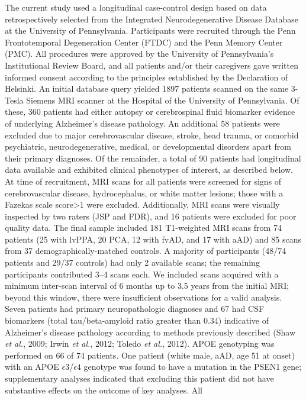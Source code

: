 \documentclass[]{article}
\begin{document}
The current study used a longitudinal case-control design based on data
retrospectively selected from the Integrated Neurodegenerative Disease
Database at the University of Pennsylvania. Participants were recruited
through the Penn Frontotemporal Degeneration Center (FTDC) and the Penn
Memory Center (PMC). All procedures were approved by the University of
Pennsylvania's Institutional Review Board, and all patients and/or their
caregivers gave written informed consent according to the principles
established by the Declaration of Helsinki. An initial database query
yielded 1897 patients scanned on the same 3-Tesla Siemens MRI scanner at
the Hospital of the University of Pennsylvania. Of these, 360 patients
had either autopsy or cerebrospinal fluid biomarker evidence of
underlying Alzheimer's disease pathology. An additional 58 patients were
excluded due to major cerebrovascular disease, stroke, head trauma, or
comorbid psychiatric, neurodegenerative, medical, or developmental
disorders apart from their primary diagnoses. Of the remainder, a total
of 90 patients had longitudinal data available and exhibited clinical
phenotypes of interest, as described below. At time of recruitment, MRI
scans for all patients were screened for signs of cerebrovascular
disease, hydrocephalus, or white matter lesions; those with a Fazekas
scale score\textgreater{}1 were excluded. Additionally, MRI scans were
visually inspected by two raters (JSP and FDR), and 16 patients were
excluded for poor quality data. The final sample included 181
T1-weighted MRI scans from 74 patients (25 with lvPPA, 20 PCA, 12 with
fvAD, and 17 with aAD) and 85 scans from 37 demographically-matched
controls. A majority of participants (48/74 patients and 29/37 controls)
had only 2 available scans; the remaining participants contributed 3--4
scans each. We included scans acquired with a minimum inter-scan
interval of 6 months up to 3.5 years from the initial MRI; beyond this
window, there were insufficient observations for a valid analysis. Seven
patients had primary neuropathologic diagnoses and 67 had CSF biomarkers
(total tau/beta-amyloid ratio greater than 0.34) indicative of
Alzheimer's disease pathology according to methods previously described
(Shaw \emph{et al.}, 2009; Irwin \emph{et al.}, 2012; Toledo \emph{et
al.}, 2012). APOE genotyping was performed on 66 of 74 patients. One
patient (white male, aAD, age 51 at onset) with an APOE
\(\epsilon3\)/\(\epsilon4\) genotype was found to have a mutation in the
PSEN1 gene; supplementary analyses indicated that excluding this patient
did not have substantive effects on the outcome of key analyses. All
\end{document}
